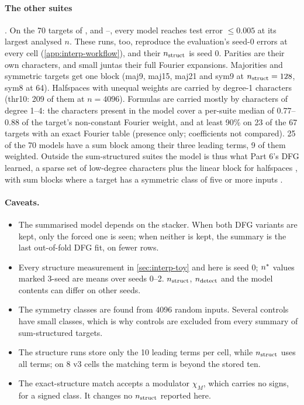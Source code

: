 \paragraph{The other suites} . On the 70 targets of ,  and --, every model reaches test error $\le0.005$ at its largest analysed $n$. These runs, too, reproduce the evaluation's seed-0 errors at every cell (\cref{app:interp-workflow}), and their $n_{\rm struct}$ is seed 0. Parities are their own characters, and small juntas their full Fourier expansions. Majorities and symmetric targets get one block (maj9, maj15, maj21 and sym9 at $n_{\rm struct}=128$, sym8 at 64). Halfspaces with unequal weights are carried by degree-1 characters (thr10: 209 of them at $n=4096$). Formulas are carried mostly by characters of degree 1--4: the characters present in the model cover a per-suite median of 0.77--0.88 of the target's non-constant Fourier weight, and at least 90\% on 23 of the 67 targets with an exact Fourier table (presence only; coefficients not compared). 25 of the 70 models have a sum block among their three leading terms, 9 of them weighted. Outside the sum-structured suites the model is thus what Part 6's DFG learned, a sparse set of low-degree characters plus the linear block for halfspaces \cite{discretelearners2026}, with sum blocks where a target has a symmetric class of five or more inputs .

\paragraph{Caveats.}
\begin{itemize}
\item The summarised model depends on the stacker. When both DFG variants are kept, only the forced one is seen; when neither is kept, the summary is the last out-of-fold DFG fit, on fewer rows.
\item Every structure measurement in \cref{sec:interp-toy} and here is seed 0; $n^{*}$ values marked 3-seed are means over seeds 0--2. $n_{\rm struct}$, $n_{\rm detect}$ and the model contents can differ on other seeds.
\item The symmetry classes are found from 4096 random inputs. Several controls have small classes, which is why controls are excluded from every summary of sum-structured targets.
\item The structure runs store only the 10 leading terms per cell, while $n_{\rm struct}$ uses all terms; on 8 v3 cells the matching term is beyond the stored ten.
\item The exact-structure match accepts a modulator $\chi_M$, which carries no signs, for a signed class. It changes no $n_{\rm struct}$ reported here.
\end{itemize}

